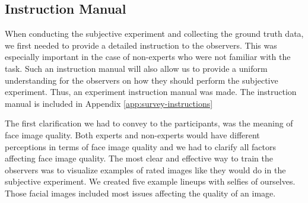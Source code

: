 \subsection{Instruction Manual}
\label{sec:intromanual}
When conducting the subjective experiment and collecting the ground truth data, we first needed to provide a detailed instruction to the observers. This was especially important in the case of non-experts who were not familiar with the task. Such an instruction manual will also allow us to provide a uniform understanding for the observers on how they should perform the subjective experiment. Thus, an experiment instruction manual was made. The instruction manual is included in Appendix \ref{app:survey-instructions} 

The first clarification we had to convey to the participants, was the meaning of face image quality. Both experts and non-experts would have different perceptions in terms of face image quality and we had to clarify all factors affecting face image quality. The most clear and effective way to train the observers was to visualize examples of rated images like they would do in the subjective experiment. We created five example lineups with selfies of ourselves. Those facial images included most issues affecting the quality of an image. 

